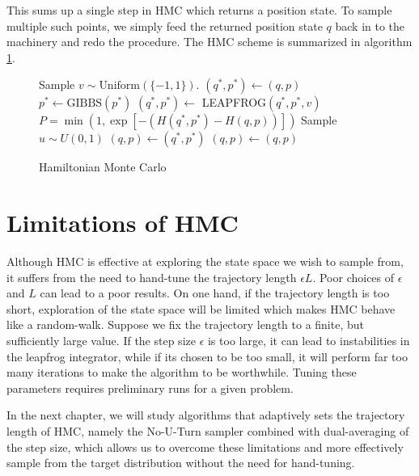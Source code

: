 This sums up a single step in HMC which returns a position state. To sample multiple such points, we simply feed the returned position state $q$ back in to the machinery 
and redo the procedure.
The HMC scheme is summarized in algorithm \ref{algo:hmc}.
\begin{figure}[H]
	\begin{algorithm}[H]
		\caption{Hamiltonian Monte Carlo}\label{algo:hmc}
		\begin{algorithmic}
      \State Sample $v \sim \text{Uniform}(\{-1, 1\})$.
      \State $(q^*, p^*) \leftarrow (q, p)$    
      \State $p^* \leftarrow \text{GIBBS}(p^*)$
       
        \State $(q^*, p^*) \leftarrow$ LEAPFROG$(q^*, p^*, v)$
      \EndFor
      \State $P = \min \left(1, \exp\left[-\left(H(q^*,p^*) - H(q, p)\right)\right]\right)$
      \State Sample $u \sim U(0,1)$ 
        \State $(q, p) \leftarrow (q^*, p^*)$ 
      \Else
        \State $(q, p) \leftarrow (q, p)$ 
      \EndIf
      \EndProcedure
		\end{algorithmic}
	\end{algorithm}
\end{figure}

\section{Limitations of HMC}
Although HMC is effective at exploring the state space we wish to sample from, it suffers from the need to hand-tune
the trajectory length $\epsilon L$. Poor choices of $\epsilon$ and $L$ can lead to a poor results.
On one hand, if the trajectory length is too short, exploration of the state space will be limited 
which makes HMC behave like a random-walk. Suppose we fix the trajectory length to a finite,
but sufficiently large value.
If the step size $\epsilon$ is too large,
it can lead to instabilities in the leapfrog integrator, while if its chosen to be too small, it will perform far too many
iterations to make the algorithm to be worthwhile. 
Tuning these parameters requires preliminary runs for a given problem. 

In the next chapter, we will study algorithms that adaptively sets the trajectory length of HMC,
namely the No-U-Turn sampler combined with dual-averaging of the step size, which allows us to overcome these
limitations and more effectively sample from the target distribution without the need for hand-tuning.

